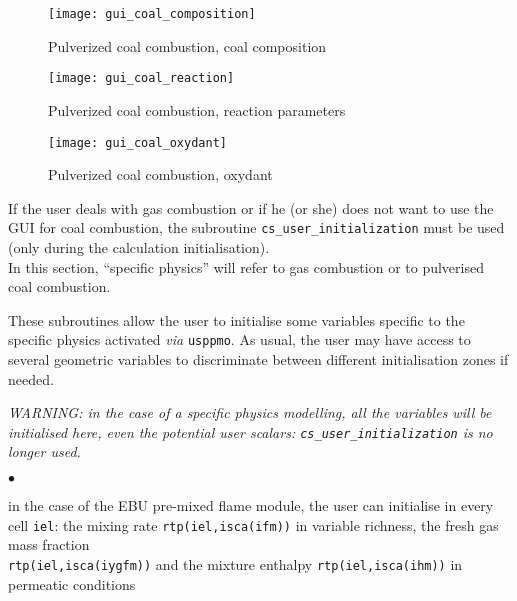 {{\begin{figure}[!ht]
\begin{center}
\texttt{[image: gui\_coal\_composition]}
\caption{Pulverized coal combustion, coal composition}
\label{fig:Ini-coal3}
\end{center}
\end{figure}

\begin{figure}[!ht]
\begin{center}
\texttt{[image: gui\_coal\_reaction]}
\caption{Pulverized coal combustion, reaction parameters}
\label{fig:Ini-coal4}
\end{center}
\end{figure}

\begin{figure}[!ht]
\begin{center}
\texttt{[image: gui\_coal\_oxydant]}
\caption{Pulverized coal combustion, oxydant}
\label{fig:Ini-coal5}
\end{center}
\end{figure}

If the user deals with gas combustion or if he (or she) does not want to use the
GUI for coal combustion, the subroutine \texttt{cs\_user\_initialization} must be used (only during the calculation initialisation).\\
In this section, ``specific physics'' will refer to gas combustion or
to pulverised coal combustion.

These subroutines allow the user to initialise some variables specific
to the specific physics activated {\em via} \texttt{usppmo}. As usual,
the user may have access to several geometric variables to discriminate
between different initialisation zones if needed.

{\em WARNING: in the case of a specific physics modelling, all the
variables will be initialised here, even the potential user scalars: {\em
\texttt{cs\_user\_initialization}} is no longer used.}


\begin{list}{$\bullet$}{}
       \item in the case of the EBU pre-mixed flame module, the user can
             initialise in every cell \texttt{iel}: the mixing rate
             \texttt{rtp(iel,isca(ifm))} in variable richness, the
             fresh gas mass fraction \\
             \texttt{rtp(iel,isca(iygfm))}
             and the mixture enthalpy \texttt{rtp(iel,isca(ihm))} in
             permeatic conditions


\end{list}}}
